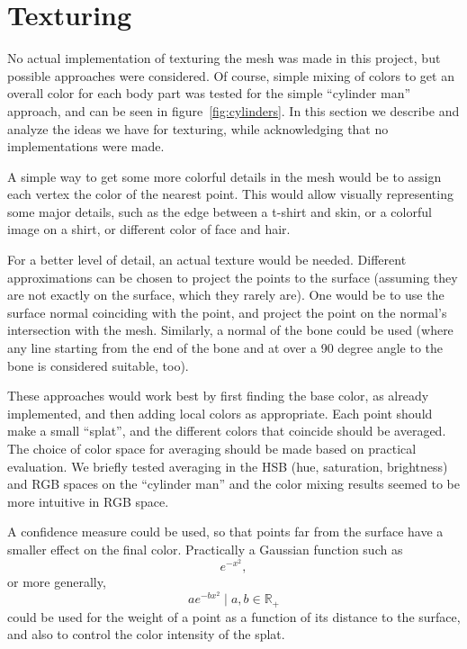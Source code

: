
\section{Texturing}

No actual implementation of texturing the mesh was made in this project, but possible approaches were considered. Of course, simple mixing of colors to get an overall color for each body part was tested for the simple ``cylinder man'' approach, and can be seen in figure~\ref{fig:cylinders}. In this section we describe and analyze the ideas we have for texturing, while acknowledging that no implementations were made.

A simple way to get some more colorful details in the mesh would be to assign each vertex the color of the nearest point. This would allow visually representing some major details, such as the edge between a t-shirt and skin, or a colorful image on a shirt, or different color of face and hair.

For a better level of detail, an actual texture would be needed. Different approximations can be chosen to project the points to the surface (assuming they are not exactly on the surface, which they rarely are). One would be to use the surface normal coinciding with the point, and project the point on the normal's intersection with the mesh. Similarly, a normal of the bone could be used (where any line starting from the end of the bone and at over a 90 degree angle to the bone is considered suitable, too).

These approaches would work best by first finding the base color, as already implemented, and then adding local colors as appropriate. Each point should make a small ``splat'', and the different colors that coincide should be averaged. The choice of color space for averaging should be made based on practical evaluation. We briefly tested averaging in the HSB (hue, saturation, brightness) and RGB spaces on the ``cylinder man'' and the color mixing results seemed to be more intuitive in RGB space.

A confidence measure could be used, so that points far from the surface have a smaller effect on the final color. Practically a Gaussian function such as
\begin{equation*}
    e^{-x^2},
\end{equation*}
or more generally,
\begin{equation*}
    a e^{-b x^2} \mid a, b \in \mathbb{R}_+
\end{equation*}
could be used for the weight of a point as a function of its distance to the surface, and also to control the color intensity of the splat.

